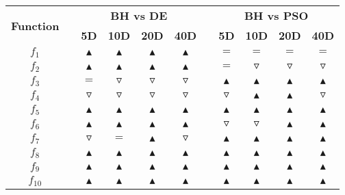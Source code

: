 \begin{tabular}{ccccccccccc}
\toprule
\multirow{2}{*}{\textbf{Function}} & \phantom{abcd} & \multicolumn{4}{c}{\textbf{BH vs DE}} & \phantom{abcd} & \multicolumn{4}{c}{\textbf{BH vs PSO}} \\
\cmidrule{3-6} \cmidrule{8-11}
 && \phantom{a}\textbf{5D}\phantom{a} & \phantom{a}\textbf{10D}\phantom{a} & \phantom{a}\textbf{20D}\phantom{a} & \phantom{a}\textbf{40D}\phantom{a} && \phantom{a}\textbf{5D}\phantom{a} & \phantom{a}\textbf{10D}\phantom{a} & \phantom{a}\textbf{20D}\phantom{a} & \phantom{a}\textbf{40D}\phantom{a} \\
\midrule
\midrule
$f_{1}$ && $\blacktriangle$ & $\blacktriangle$ & $\blacktriangle$ & $\blacktriangle$ &  & $=$ & $=$ & $=$ & $=$ \\
$f_{2}$ && $\blacktriangle$ & $\blacktriangle$ & $\blacktriangle$ & $\blacktriangle$ &  & $=$ & $\triangledown$ & $\triangledown$ & $\triangledown$ \\
$f_{3}$ && $=$ & $\triangledown$ & $\triangledown$ & $\triangledown$ &  & $\blacktriangle$ & $\blacktriangle$ & $\blacktriangle$ & $\blacktriangle$ \\
$f_{4}$ && $\triangledown$ & $\triangledown$ & $\triangledown$ & $\triangledown$ &  & $\triangledown$ & $\blacktriangle$ & $\blacktriangle$ & $\triangledown$ \\
$f_{5}$ && $\blacktriangle$ & $\blacktriangle$ & $\blacktriangle$ & $\blacktriangle$ &  & $\blacktriangle$ & $\blacktriangle$ & $\blacktriangle$ & $\blacktriangle$ \\
\midrule
$f_{6}$ && $\blacktriangle$ & $\blacktriangle$ & $\blacktriangle$ & $\blacktriangle$ &  & $\triangledown$ & $\triangledown$ & $\blacktriangle$ & $\blacktriangle$ \\
$f_{7}$ && $\triangledown$ & $=$ & $\blacktriangle$ & $\triangledown$ &  & $\blacktriangle$ & $\blacktriangle$ & $\blacktriangle$ & $\blacktriangle$ \\
$f_{8}$ && $\blacktriangle$ & $\blacktriangle$ & $\blacktriangle$ & $\blacktriangle$ &  & $\blacktriangle$ & $\blacktriangle$ & $\blacktriangle$ & $\blacktriangle$ \\
$f_{9}$ && $\blacktriangle$ & $\blacktriangle$ & $\blacktriangle$ & $\blacktriangle$ &  & $\blacktriangle$ & $\blacktriangle$ & $\blacktriangle$ & $\blacktriangle$ \\
\midrule
$f_{10}$ && $\blacktriangle$ & $\blacktriangle$ & $\blacktriangle$ & $\blacktriangle$ &  & $\blacktriangle$ & $\blacktriangle$ & $\blacktriangle$ & $\blacktriangle$ \\

\end{tabular}
